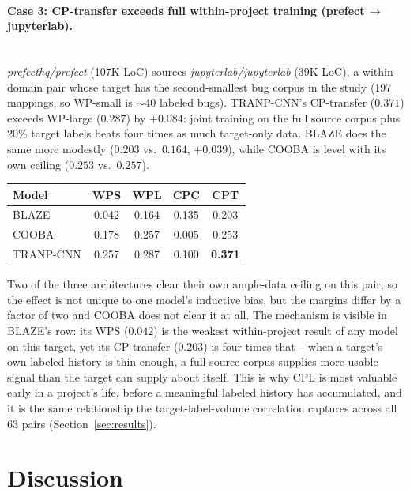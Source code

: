 \documentclass[a4paper,fleqn]{cas-dc}
\begin{document}
\paragraph{Case 3: CP-transfer exceeds full within-project training (prefect\,$\to$\,jupyterlab).} \\
\textit{prefecthq/prefect} (107K LoC) sources
\textit{jupyterlab/jupyterlab} (39K LoC), a within-domain pair whose target has
the second-smallest bug corpus in the study (197 mappings, so WP-small is
$\sim$40 labeled bugs). TRANP-CNN's CP-transfer ($0.371$) exceeds WP-large
($0.287$) by $+0.084$: joint training on the full source corpus plus 20\%
target labels beats four times as much target-only data. BLAZE does the same
more modestly ($0.203$ vs.\ $0.164$, $+0.039$), while COOBA is level with its
own ceiling ($0.253$ vs.\ $0.257$).

\begin{center}
\small
\begin{tabular}{lcccc}
\toprule
Model & WPS & WPL & CPC & CPT \\ \midrule
BLAZE     & 0.042 & 0.164 & 0.135 & 0.203 \\
COOBA     & 0.178 & 0.257 & 0.005 & 0.253 \\
TRANP-CNN & 0.257 & 0.287 & 0.100 & \textbf{0.371} \\ \bottomrule
\end{tabular}
\end{center}

\noindent Two of the three architectures clear their own ample-data ceiling on
this pair, so the effect is not unique to one model's inductive bias, but the
margins differ by a factor of two and COOBA does not clear it at all. The
mechanism is visible in BLAZE's row: its WPS ($0.042$) is the weakest
within-project result of any model on this target, yet its CP-transfer
($0.203$) is four times that -- when a target's own labeled history is thin
enough, a full source corpus supplies more usable signal than the target can
supply about itself. This is why CPL is most valuable early in a project's
life, before a meaningful labeled history has accumulated, and it is the same
relationship the target-label-volume correlation captures across all 63 pairs
(Section~\ref{sec:results}).

\section{Discussion}
\label{sec:discussion}
\end{document}
